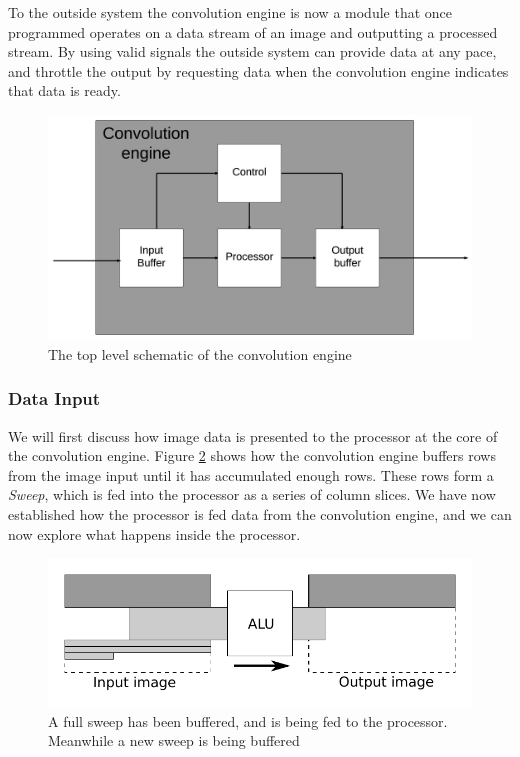 To the outside system the convolution engine is now a module that once programmed operates on a data stream of an image and outputting a processed stream. 
By using valid signals the outside system can provide data at any pace, and throttle the output by requesting data when the convolution engine indicates that data is ready. 

\begin{figure}[h!]
    \includegraphics[width=\linewidth]{img/convolution_engine.png}
    \caption{The top level schematic of the convolution engine}
    \label{fig:conv_engine}
\end{figure}

\subsubsection{Data Input}
We will first discuss how image data is presented to the processor at the core of the convolution engine.
Figure \ref{fig:sweep_feed} shows how the convolution engine buffers rows from the image input until it has accumulated enough rows.
These rows form a \textit{Sweep}, which is fed into the processor as a series of column slices.
We have now established how the processor is fed data from the convolution engine, and we can now explore what happens inside the processor.

\begin{figure}[h!]
    \includegraphics[width=\linewidth]{img/daisy_processing.pdf}
    \caption{A full sweep has been buffered, and is being fed to the processor. Meanwhile a new sweep is being buffered}
    \label{fig:sweep_feed}
\end{figure}

